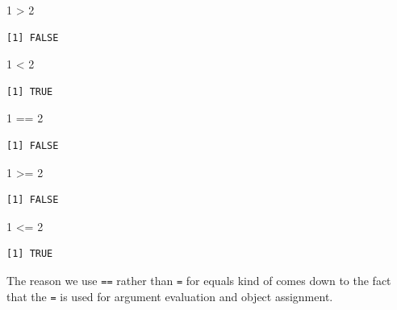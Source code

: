 \documentclass[
  letterpaper,
  DIV=11,
  numbers=noendperiod,
  oneside]{scrreprt}
\newenvironment{Shaded}{\begin{snugshade}}{\end{snugshade}}
\newcommand{\DecValTok}[1]{\textcolor[rgb]{0.68,0.00,0.00}{#1}}
\newcommand{\SpecialCharTok}[1]{\textcolor[rgb]{0.37,0.37,0.37}{#1}}
\begin{document}
\begin{Shaded}
\begin{Highlighting}[]
\DecValTok{1} \SpecialCharTok{\textgreater{}} \DecValTok{2}
\end{Highlighting}
\end{Shaded}

\begin{verbatim}
[1] FALSE
\end{verbatim}

\begin{Shaded}
\begin{Highlighting}[]
\DecValTok{1} \SpecialCharTok{\textless{}} \DecValTok{2}
\end{Highlighting}
\end{Shaded}

\begin{verbatim}
[1] TRUE
\end{verbatim}

\begin{Shaded}
\begin{Highlighting}[]
\DecValTok{1} \SpecialCharTok{==} \DecValTok{2} 
\end{Highlighting}
\end{Shaded}

\begin{verbatim}
[1] FALSE
\end{verbatim}

\begin{Shaded}
\begin{Highlighting}[]
\DecValTok{1} \SpecialCharTok{\textgreater{}=} \DecValTok{2}
\end{Highlighting}
\end{Shaded}

\begin{verbatim}
[1] FALSE
\end{verbatim}

\begin{Shaded}
\begin{Highlighting}[]
\DecValTok{1} \SpecialCharTok{\textless{}=} \DecValTok{2}
\end{Highlighting}
\end{Shaded}

\begin{verbatim}
[1] TRUE
\end{verbatim}

The reason we use \texttt{==} rather than \texttt{=} for equals kind of
comes down to the fact that the \texttt{=} is used for argument
evaluation and object assignment.
\end{document}
